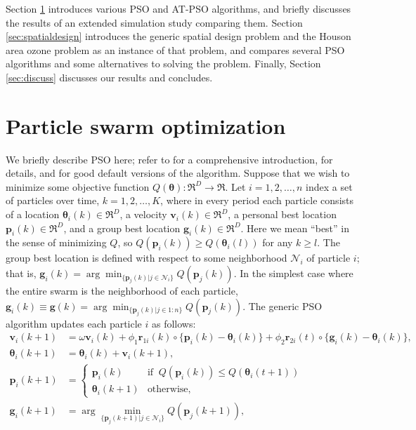 \documentclass[cmbright]{staauth}
\begin{document}
Section \ref{sec:pso} introduces various PSO and AT-PSO algorithms, and briefly discusses the results of an extended simulation study comparing them. Section \ref{sec:spatialdesign} introduces the generic spatial design problem and the Houson area ozone problem as an instance of that problem, and compares several PSO algorithms and some alternatives to solving the problem. Finally, Section \ref{sec:discuss} discusses our results and concludes.

\section{Particle swarm optimization}\label{sec:pso}
We briefly describe PSO here; refer to \citet{blum2008swarm} for a comprehensive introduction, \citet{clerc2010particle} for details, and \citet{clerc2011spso} for good default versions of the algorithm. Suppose that we wish to minimize some objective function $Q(\bm{\theta}):\Re^D\to\Re$. Let $i=1,2,\dots,n$ index a set of particles over time, $k=1,2,\dots,K$, where in every period each particle consists of a location $\bm{\theta}_i(k)\in \Re^D$, a velocity $\bm{v}_i(k) \in \Re^D$, a personal best location $\bm{p}_i(k)\in\Re^D$, and a group best location $\bm{g}_i(k)\in\Re^D$. Here we mean ``best'' in the sense of minimizing $Q$, so $Q(\bm{p}_i(k)) \geq Q(\bm{\theta}_i(l))$ for any $k\geq l$. The group best location is defined with respect to some neighborhood $\mathcal{N}_i$ of particle $i$; that is, $\bm{g}_i(k) = \arg\min_{\{\bm{p}_j(k)|j\in\mathcal{N}_i\}}Q(\bm{p}_j(k))$. In the simplest case where the entire swarm is the neighborhood of each particle, $\bm{g}_i(k)\equiv \bm{g}(k) = \arg\min_{\{\bm{p}_j(k)|j\in 1:n\}}Q(\bm{p}_j(k))$. The generic PSO algorithm updates each particle $i$ as follows:
\begin{align}\label{eq:pso}
\bm{v}_i(k+1) &= \omega \bm{v}_i(k) + \phi_1 \bm{r}_{1i}(k)\circ\{\bm{p}_i(k) - \bm{\theta}_i(k)\} + \phi_2 \bm{r}_{2i}(t)\circ\{\bm{g}_i(k) - \bm{\theta}_i(k)\},\nonumber\\
\bm{\theta}_i(k+1) &= \bm{\theta}_i(k) + \bm{v}_i(k+1),\nonumber\\
\bm{p}_i(k+1) &= \begin{cases} \bm{p}_i(k)   & \mbox{if }\  Q(\bm{p}_i(k)) \le Q(\bm{\theta}_i(t + 1))\\
                               \bm{\theta}_i(k+1) & \mbox{otherwise},
\end{cases}\nonumber\\
\bm{g}_i(k+1) &= \arg\min_{\{\bm{p}_j(k+1)|j\in\mathcal{N}_i\}}Q(\bm{p}_j(k+1)),
\end{align}
\end{document}
